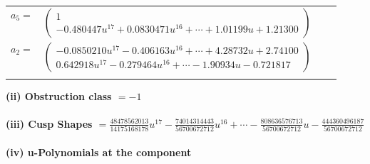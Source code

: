 \documentclass[1p]{elsarticle_modified}
\theoremstyle{definition}
\begin{document}
\begin{tabular}{m{7pt} m{180pt} m{7pt} m{180pt} }
\flushright $a_{5}=$&$\begin{pmatrix}1\\-0.480447 u^{17}+0.0830471 u^{16}+\cdots+1.01199 u+1.21300\end{pmatrix}$ \\
\flushright $a_{2}=$&$\begin{pmatrix}-0.0850210 u^{17}-0.406163 u^{16}+\cdots+4.28732 u+2.74100\\0.642918 u^{17}-0.279464 u^{16}+\cdots-1.90934 u-0.721817\end{pmatrix}$\\&\end{tabular}
\flushleft \textbf{(ii) Obstruction class $= -1$}\\~\\
\flushleft \textbf{(iii) Cusp Shapes $= \frac{48478562013}{14175168178} u^{17}-\frac{74014314443}{56700672712} u^{16}+\cdots-\frac{808636576713}{56700672712} u-\frac{444360496187}{56700672712}$}\\~\\
\newpage\renewcommand{\arraystretch}{1}
\flushleft \textbf{(iv) u-Polynomials at the component}\newline \\
\end{document}
